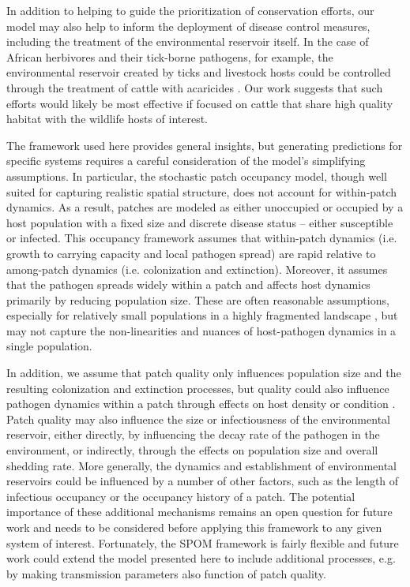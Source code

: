 \documentclass{article}
\begin{document}
In addition to helping to guide the prioritization of conservation efforts, our model may also help to inform the deployment of disease control measures, including the treatment of the environmental reservoir itself.
In the case of African herbivores and their tick-borne pathogens, for example, the environmental reservoir created by ticks and livestock hosts could be controlled through the treatment of cattle with acaricides \cite{Keesing2013}.
Our work suggests that such efforts would likely be most effective if focused on cattle that share high quality habitat with the wildlife hosts of interest.

The framework used here provides general insights, but generating predictions for specific systems requires a careful consideration of the model's simplifying assumptions.
In particular, the stochastic patch occupancy model, though well suited for capturing realistic spatial structure, does not account for within-patch dynamics.
As a result, patches are modeled as either unoccupied or occupied by a host population with a fixed size and discrete disease status -- either susceptible or infected.
This occupancy framework assumes that within-patch dynamics (i.e. growth to carrying capacity and local pathogen spread) are rapid relative to among-patch dynamics (i.e. colonization and extinction).
Moreover, it assumes that the pathogen spreads widely within a patch and affects host dynamics primarily by reducing population size.
These are often reasonable assumptions, especially for relatively small populations in a highly fragmented landscape \cite{Hanski2003}, but may not capture the non-linearities and nuances of host-pathogen dynamics in a single population.

In addition, we assume that patch quality only influences population size and the resulting colonization and extinction processes, but quality could also influence pathogen dynamics within a patch through effects on host density or condition \cite{Becker2015}.
Patch quality may also influence the size or infectiousness of the environmental reservoir, either directly, by influencing the decay rate of the pathogen in the environment, or indirectly, through the effects on population size and overall shedding rate.
More generally, the dynamics and establishment of environmental reservoirs could be influenced by a number of other factors, such as the length of infectious occupancy or the occupancy history of a patch.
The potential importance of these additional mechanisms remains an open question for future work and needs to be considered before applying this framework to any given system of interest.
Fortunately, the SPOM framework is fairly flexible and future work could extend the model presented here to include additional processes, e.g. by making transmission parameters also function of patch quality.
\end{document}
